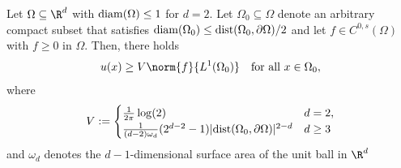 \documentclass{amsart}[11pt]
\numberwithin{equation}{section}
\numberwithin{theorem}{section}
\begin{document}
\begin{lemma}\label{lem:maximum}
    Let $\Omega\subseteq \R^d$ with ${\rm diam}(\Omega)\leq 1$ for $d=2$. Let $\Omega_0\subseteq \Omega$ denote an arbitrary compact subset that satisfies ${\rm diam}(\Omega_0)\leq {\rm dist}(\Omega_0,\partial\Omega)/2$ and let $f \in C^{0, s}(\Omega)$ with $f\geq 0$ in $\Omega$. Then, there holds
    \begin{align*}
    u(x) \geq V\norm{f}{L^1(\Omega_0)}\quad \text{for all }x\in \Omega_0,
    \end{align*}
    where 
    \begin{align*}
        V:=\begin{cases}
            \frac{1}{2\pi}\log(2) & d=2,\\
            \frac{1}{(d-2)\omega_d}(2^{d-2}-1)|{\rm dist}(\Omega_0,\partial\Omega)|^{2-d}& d\geq 3
        \end{cases}
    \end{align*} 
    and $\omega_d$ denotes the $d-1$-dimensional surface area of the unit ball in $\R^d$
    \end{lemma}
\end{document}
